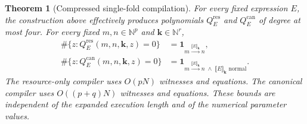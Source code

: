 \documentclass[11pt,a4paper]{article}
\newtheorem{theorem}{Theorem}[section]
\theoremstyle{definition}
\theoremstyle{remark}
\newcommand{\N}{\mathbb N}
\begin{document}
\begin{theorem}[Compressed single-fold compilation]
\label{cdc:cs:thm:compiler}
For every fixed expression $E$, the construction above effectively produces
polynomials $Q_E^{\mathrm{res}}$ and $Q_E^{\mathrm{can}}$ of degree at most four.
For every fixed $m,n\in\N^p$ and $\mathbf{k}\in\N^r$,
\begin{align}
\#\{z:Q_E^{\mathrm{res}}(m,n,\mathbf{k},z)=0\}&=
\mathbf1_{m\xrightarrow{\llbracket E\rrbracket_{\mathbf{k}}}n},
\label{cdc:cs:eq:compilerres}\\
\#\{z:Q_E^{\mathrm{can}}(m,n,\mathbf{k},z)=0\}&=
\mathbf1_{m\xrightarrow{\llbracket E\rrbracket_{\mathbf{k}}}n\;\wedge\;
\llbracket E\rrbracket_{\mathbf{k}}\text{ normal}}.
\label{cdc:cs:eq:compilercan}
\end{align}
The resource-only compiler uses $O(pN)$ witnesses and equations. The canonical
compiler uses $O((p+q)N)$ witnesses and equations. These bounds are independent
of the expanded execution length and of the numerical parameter values.
\end{theorem}
\end{document}
